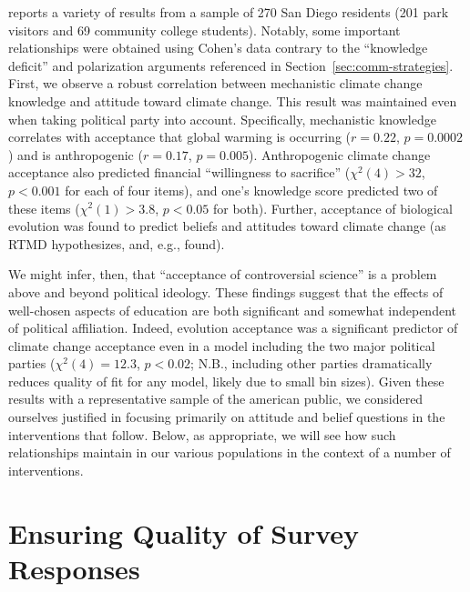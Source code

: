 \textcite{cohen_san_2012_f} reports a variety of results from a sample of 270
San Diego residents (201 park visitors and 69 community college students).
Notably, some important relationships were obtained using Cohen’s data contrary
to the “knowledge deficit” and polarization arguments referenced in
Section~\ref{sec:comm-strategies}. First, we observe a robust correlation
between mechanistic climate change knowledge and attitude toward climate change.
This result was maintained even when taking political party into account.
Specifically, mechanistic knowledge correlates with acceptance that global
warming is occurring ($r=0.22$, $p=0.0002$) and is anthropogenic ($r=0.17$,
$p=0.005$).  Anthropogenic climate change acceptance also predicted financial
“willingness to sacrifice” ($χ^2(4) > 32$, $p<0.001$ for each of four items),
and one’s knowledge score predicted two of these items ($χ^2(1) > 3.8$, $p<0.05$
for both). Further, acceptance of biological evolution was found to predict
beliefs and attitudes toward climate change (as RTMD hypothesizes, and, e.g.,
 found). 

We might infer, then, that “acceptance of controversial science” is a problem
above and beyond political ideology. These findings suggest that the effects of
well-chosen aspects of education are both significant and somewhat independent
of political affiliation. Indeed, evolution acceptance was a significant
predictor of climate change acceptance even in a model including the two major
political parties ($\chi^2(4)=12.3$, $p<0.02$; N.B., including other parties
dramatically reduces quality of fit for any model, likely due to small bin
sizes). Given these results with a representative sample of the american public,
we considered ourselves justified in focusing primarily on attitude and belief
questions in the interventions that follow.  
Below, as appropriate, we will see how such relationships maintain
in our various populations in the context of a number of interventions.

% 

\section{Ensuring Quality of Survey Responses}
\label{sec:attitude-quality}

